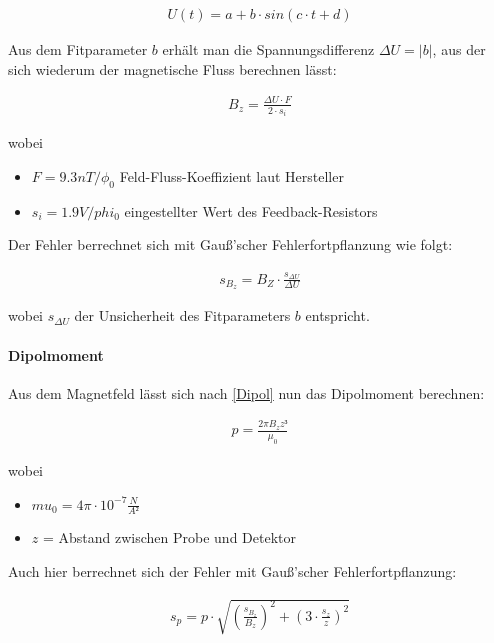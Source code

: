 \documentclass[12pt]{article}
\begin{document}
\begin{align}
U(t) = a + b\cdot sin(c\cdot t+d) \label{U}
\end{align}

Aus dem Fitparameter $b$ erhält man die Spannungsdifferenz $\Delta U = \left| b \right| $, aus der sich wiederum der magnetische Fluss berechnen lässt:

\begin{align}
B_z = \frac{\Delta U \cdot F }{2 \cdot s_i} \label{B}
\end{align}

wobei 

\begin{itemize}
\item $ F = 9.3 nT/\phi_0$  Feld-Fluss-Koeffizient laut Hersteller
\item $s_i = 1.9 V/phi_{0}$ eingestellter Wert des Feedback-Resistors
\end{itemize}

Der Fehler berrechnet sich mit Gauß'scher Fehlerfortpflanzung wie folgt:

\begin{align}
s_{B_z} = B_Z \cdot \frac{s_{\Delta U}}{\Delta U}
\end{align}

wobei $s_{\Delta U}$ der Unsicherheit des Fitparameters $b$ entspricht.

\paragraph{Dipolmoment} Aus dem Magnetfeld lässt sich nach \ref{Dipol} nun das Dipolmoment berechnen:

\begin{align}
p = \frac{2\pi B_z z³}{\mu_0} \label{p}
\end{align}

wobei 
\begin{itemize}
\item $mu_0 = 4 \pi \cdot 10^{-7} \frac{N}{A²}$
\item $z$ = Abstand zwischen Probe und Detektor
\end{itemize}

Auch hier berrechnet sich der Fehler mit Gauß'scher Fehlerfortpflanzung:

\begin{align}
s_p = p \cdot \sqrt{\left( \frac{s_{B_z}}{B_z}\right)^2  + \left(3\cdot \frac{s_z}{z}\right)^2}
\end{align}
\end{document}
